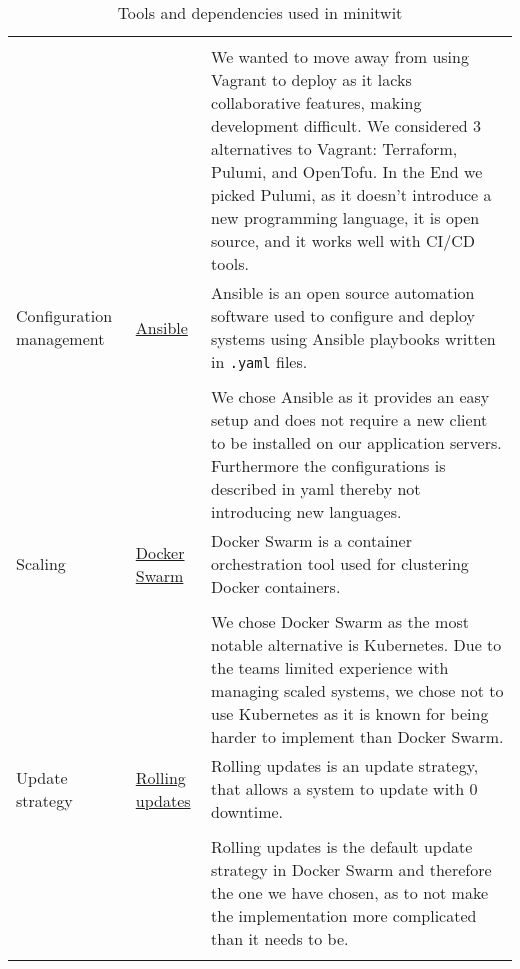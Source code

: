 \begin{longtable}{|p{}|p{} | p{}|}
    &&\\
    &&  We wanted to move away from using Vagrant to deploy as it lacks collaborative features, making development difficult. We considered 3 alternatives to Vagrant: Terraform, Pulumi, and OpenTofu. In the End we picked Pulumi, as it doesn't introduce a new programming language, it is open source, and it works well with CI/CD tools.\\
    \hline
    Configuration management & \href{https://docs.ansible.com/}{Ansible} & Ansible is an open source automation software used to configure and deploy systems using Ansible playbooks written in \texttt{.yaml} files.\\
    &&\\
    && We chose Ansible as it provides an easy setup and does not require a new client to be installed on our application servers. Furthermore the configurations is described in yaml thereby not introducing new languages.\\
    \hline
    Scaling & \href{https://docs.docker.com/reference/cli/docker/swarm/}{Docker Swarm} & Docker Swarm is a container orchestration tool used for clustering Docker containers.\\
    &&\\
    && We chose Docker Swarm as the most notable alternative is Kubernetes. Due to the teams limited experience with managing scaled systems, we chose not to use Kubernetes as it is known for being harder to implement than Docker Swarm.\\
    \hline
    Update strategy & \href{https://docs.docker.com/engine/swarm/swarm-tutorial/rolling-upate/}{Rolling updates} & Rolling updates is an update strategy, that allows a system to update with 0 downtime.\\
    &&\\
    && Rolling updates is the default update strategy in Docker Swarm and therefore the one we have chosen, as to not make the implementation more complicated than it needs to be.\\
    \hline
    \caption{Tools and dependencies used in minitwit}
\end{longtable}
